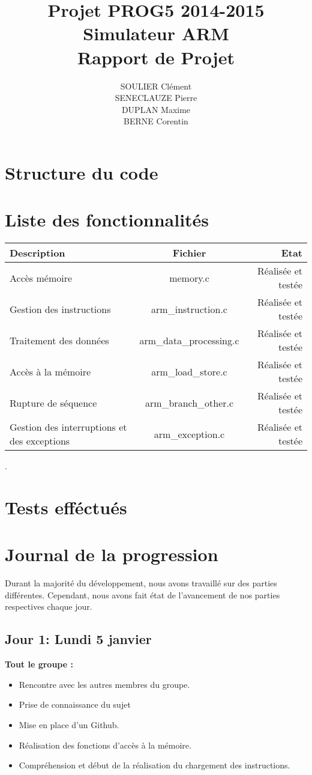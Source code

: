 \documentclass[11pt]{article} %
\title{Projet PROG5 2014-2015 \\
Simulateur ARM \\
Rapport de Projet}
\author{SOULIER Clément \\
SENECLAUZE Pierre \\
DUPLAN Maxime \\
BERNE Corentin}
\begin{document}
\sffamily
\maketitle

\newpage
\section{Structure du code}

\section{Liste des fonctionnalités}

\begin{tabular}{|l|c|r|}
  \hline
  Description & Fichier & Etat\\
  \hline
  Accès mémoire & memory.c & Réalisée et testée \\
  Gestion des instructions & arm\_instruction.c & Réalisée et testée \\
  Traitement des données & arm\_data\_processing.c & Réalisée et testée\\
  Accès à la mémoire & arm\_load\_store.c & Réalisée et testée\\
  Rupture de séquence & arm\_branch\_other.c & Réalisée et testée\\
  Gestion des interruptions et des exceptions & arm\_exception.c & Réalisée et testée \\
  \hline
\end{tabular}.

\section{Tests efféctués}
 
\section{Journal de la progression}
 
Durant la majorit\'e du d\'eveloppement, nous avons travaill\'e sur des parties diff\'erentes. Cependant, nous avons fait \'etat de l'avancement de nos parties respectives chaque jour.

\subsection{Jour 1: Lundi 5 janvier}

\textbf{Tout le groupe :}
\begin{itemize}
  \item Rencontre avec les autres membres du groupe.
  \item Prise de connaissance du sujet
  \item Mise en place d'un Github.
  \item Réalisation des fonctions d'acc\`es \`a la m\'emoire.
  \item Compr\'ehension et début de la r\'ealisation du chargement des instructions.
\end{itemize}
\end{document}
